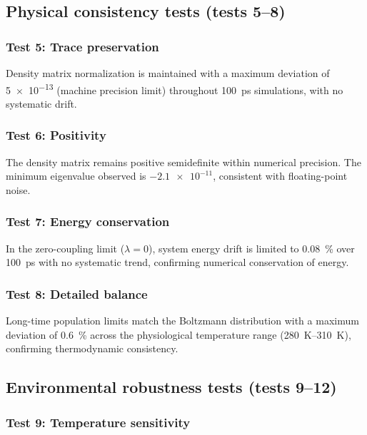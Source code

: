 \documentclass[11pt,a4paper]{article}
\begin{document}
\subsection{Physical consistency tests (tests 5--8)}

\subsubsection{Test 5: Trace preservation}

Density matrix normalization is maintained with a maximum deviation of \num{5e-13} (machine precision limit) throughout \SI{100}{\pico\second} simulations, with no systematic drift.

\subsubsection{Test 6: Positivity}

The density matrix remains positive semidefinite within numerical precision. The minimum eigenvalue observed is $\num{-2.1e-11}$, consistent with floating-point noise.

\subsubsection{Test 7: Energy conservation}

In the zero-coupling limit ($\lambda = 0$), system energy drift is limited to \SI{0.08}{\percent} over \SI{100}{\pico\second} with no systematic trend, confirming numerical conservation of energy.

\subsubsection{Test 8: Detailed balance}

Long-time population limits match the Boltzmann distribution with a maximum deviation of \SI{0.6}{\percent} across the physiological temperature range (\SIrange{280}{310}{\kelvin}), confirming thermodynamic consistency.

\subsection{Environmental robustness tests (tests 9--12)}

\subsubsection{Test 9: Temperature sensitivity}
\end{document}
